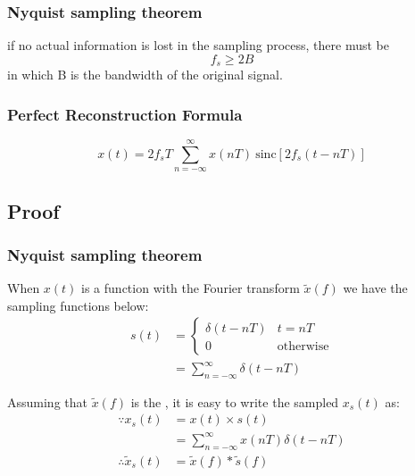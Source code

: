 \documentclass{article}
\begin{document}
\subsubsection*{Nyquist sampling theorem}

if no actual information is lost in the sampling process, there must be
\begin{equation}
    f_s \geq 2B
\end{equation}
in which B is the bandwidth of the original signal.

\subsubsection*{Perfect Reconstruction Formula}
\begin{equation}
    x(t) = 2f_s T \sum_{n = -\infty}^{\infty} x(nT) ~ \mathrm{sinc} \left[ 2f_s (t - nT) \right]
\end{equation}
\subsection{Proof}
\subsubsection*{Nyquist sampling theorem}

When $x(t)$ is a function with the Fourier transform $\widetilde{x}(f)$
we have the sampling functions below:
\begin{align}
    s(t) & =
    \left\{
    \begin{array}{lr}
        \delta(t - nT) & t = nT             \\
        0              & \mathrm{otherwise}
    \end{array}
    \right. \nonumber                                   \\
         & = \sum_{n = -\infty}^{\infty} \delta(t - nT)
\end{align}

Assuming that $\widetilde{x}(f)$ is the , it is easy to write the sampled $x_s(t)$ as:
\begin{align}
    \because x_s(t)               & = x(t)\times s(t) \nonumber                                    \\
                                  & = \sum_{n = -\infty}^{\infty} x(nT) \delta(t - nT) \label{xst} \\
    \therefore \widetilde{x}_s(t) & = \widetilde{x}(f) * \widetilde{s}(f) \label{xn}
\end{align}
\end{document}

